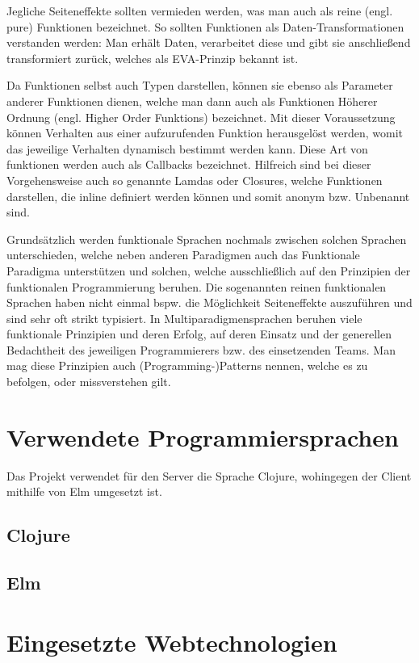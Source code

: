 Jegliche Seiteneffekte sollten vermieden werden, was man auch als reine (engl. pure) Funktionen bezeichnet.
So sollten Funktionen als Daten-Transformationen verstanden werden: Man erhält Daten, verarbeitet diese und gibt sie anschließend transformiert zurück, welches als \ac{EVA}-Prinzip bekannt ist.
\par
Da Funktionen selbst auch Typen darstellen, können sie ebenso als Parameter anderer Funktionen dienen, welche man dann auch als Funktionen Höherer Ordnung (engl. Higher Order Funktions) bezeichnet.
Mit dieser Voraussetzung können Verhalten aus einer aufzurufenden Funktion herausgelöst werden, womit das jeweilige Verhalten dynamisch bestimmt werden kann.
Diese Art von funktionen werden auch als Callbacks bezeichnet.
Hilfreich sind bei dieser Vorgehensweise auch so genannte Lamdas oder Closures, welche Funktionen darstellen, die inline definiert werden können und somit anonym \ac{bzw.} Unbenannt sind.
\par
Grundsätzlich werden funktionale Sprachen nochmals zwischen solchen Sprachen unterschieden, welche neben anderen Paradigmen auch das Funktionale Paradigma unterstützen und solchen, welche ausschließlich auf den Prinzipien der funktionalen Programmierung beruhen.
Die sogenannten reinen funktionalen Sprachen haben nicht einmal \ac{bspw.} die Möglichkeit Seiteneffekte auszuführen und sind sehr oft strikt typisiert.
In Multiparadigmensprachen beruhen viele funktionale Prinzipien und deren Erfolg, auf deren Einsatz und der generellen Bedachtheit des jeweiligen Programmierers \ac{bzw.} des einsetzenden Teams.
Man mag diese Prinzipien auch (Programming-)Patterns nennen, welche es zu befolgen, oder missverstehen gilt.

\section{Verwendete Programmiersprachen}
Das Projekt verwendet für den Server die Sprache Clojure, wohingegen der Client mithilfe von Elm umgesetzt ist.
\subsection{Clojure}
\blindtext
\par
\blindtext
\subsection{Elm}
\blindtext
\par
\blindtext
\section{Eingesetzte Webtechnologien}
